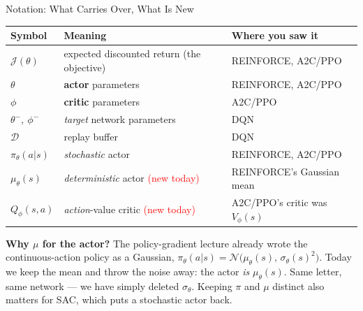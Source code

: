 \begin{frame}{Notation: What Carries Over, What Is New}
\vspace{-0.2em}
\begin{center}
\small
\renewcommand{\arraystretch}{1.25}
\begin{tabular}{lll}
\hline
\textbf{Symbol} & \textbf{Meaning} & \textbf{Where you saw it} \\
\hline
$\mathcal{J}(\theta)$        & expected discounted return (the objective)   & REINFORCE, A2C/PPO \\
$\theta$                     & \textbf{actor} parameters                    & REINFORCE, A2C/PPO \\
$\phi$                       & \textbf{critic} parameters                   & A2C/PPO \\
$\theta^{-},\ \phi^{-}$      & \emph{target} network parameters             & DQN \\
$\mathcal{D}$                & replay buffer                                & DQN \\
$\pi_\theta(a|s)$            & \emph{stochastic} actor                      & REINFORCE, A2C/PPO \\
$\mu_\theta(s)$              & \emph{deterministic} actor \; \textcolor{red}{(new today)} & REINFORCE's Gaussian mean \\
$Q_\phi(s,a)$                & \emph{action}-value critic \; \textcolor{red}{(new today)} & A2C/PPO's critic was $V_\phi(s)$ \\
\hline
\end{tabular}
\end{center}
\vspace{0.5em}
{\footnotesize
\textbf{Why $\mu$ for the actor?} The policy-gradient lecture already wrote the continuous-action policy as a Gaussian,
$\pi_\theta(a|s) = \mathcal{N}\!\big(\mu_\theta(s),\, \sigma_\theta(s)^2\big)$.
Today we keep the mean and throw the noise away: the actor \emph{is} $\mu_\theta(s)$. Same letter, same network --- we have simply deleted $\sigma_\theta$. Keeping $\pi$ and $\mu$ distinct also matters for SAC, which puts a stochastic actor back.}
\end{frame}
